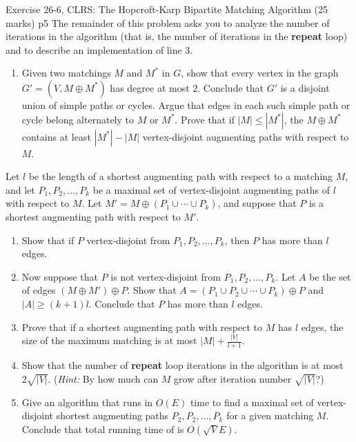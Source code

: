 \documentclass[a4paper, 11pt]{article}
\begin{document}
\begin{problem}{%
	Exercise 26-6, CLRS: The Hopcroft-Karp Bipartite Matching Algorithm	\hfill  (25 marks)
}{p5%
}
The remainder of this problem asks you to analyze the number of iterations in the algorithm (that is, the number of iterations in the \textbf{repeat} loop) and to describe an implementation of line 3.
\begin{enumerate}[resume, label=\bfseries\alph*.]
	\item Given two matchings $M$ and $M^*$ in $G$, show that every vertex in the graph $G'=(V,M\oplus M^*)$ has degree at most $2$. Conclude that $G'$ is a disjoint union of simple paths or cycles. Argue that edges in each such simple path or cycle belong alternately to $M$ or $M^*$. Prove that if $|M|\leq |M^*|$, the $M\oplus M^*$ contains at least $|M^*|-|M|$ vertex-disjoint augmenting paths with respect to $M$.
\end{enumerate}
Let $l$ be the length of a shortest augmenting path with respect to a matching $M$, and let $P_1,P_2,\dots, P_k$ be a maximal set of vertex-disjoint augmenting paths of $l$ with respect to $M$. Let $M'=M\oplus (P_1\cup \cdots \cup  P_k)$, and suppose that $P$ is a shortest augmenting path with respect to $M'$.
\begin{enumerate}[resume, label=\bfseries\alph*.]
	\item Show that if $P$ vertex-disjoint from $P_1,P_2,\dots, P_k$, then $P$ has more than $l$ edges.
	\item Now suppose that $P$ is not vertex-disjoint from $P_1,P_2,\dots, P_k$. Let $A$ be the set of edges $(M\oplus M')\oplus P$. Show that $A=(P_1\cup P_2\cup \cdots \cup P_k)\oplus P$ and $|A|\geq (k+1)l$. Conclude that $P$ has more than $l$ edges.
	\item Prove that if a shortest augmenting path with respect to $M$ has $l$ edges, the size of the maximum matching is at most $|M|+\frac{|V|}{l+1}$.
	\item  Show that the number of \textbf{repeat} loop iterations in the algorithm is at most $2\sqrt{|V|}$. (\textit{Hint:} By how much can $M$ grow after iteration number $\sqrt{|V|}$?)
	\item Give an algorithm that runs in $O(E)$ time to find a maximal set of vertex-disjoint shortest augmenting paths $P_2,P_2,\dots, P_k$ for a given matching $M$. Conclude that total running time of  is $O(\sqrt{V}E)$.
\end{enumerate}
\end{problem}
\newpage 
\end{document}
